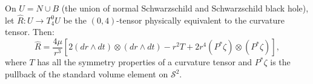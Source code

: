On $U = N \cup B$ (the union of normal Schwarzschild and Schwarzschild black hole), let $\hat{R}: U \to T_4^0 U$ be the $(0,4)$-tensor physically equivalent to the curvature tensor. Then:
$$\hat{R} = \frac{4\mu}{r^3}\left[2(dr \wedge dt) \otimes (dr \wedge dt) - r^2 T + 2r^4(P^*\zeta) \otimes (P^*\zeta)\right],$$
where $T$ has all the symmetry properties of a curvature tensor and $P^*\zeta$ is the pullback of the standard volume element on $\mathcal{S}^2$.
